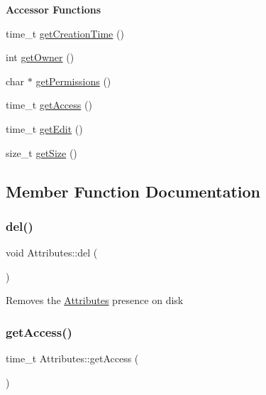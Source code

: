 \begin{Indent}\textbf{ Accessor Functions}\par
\begin{DoxyCompactItemize}
\item 
time\+\_\+t \mbox{\hyperlink{classAttributes_ac6436c08d31dfa33783feee3469a88e9}{get\+Creation\+Time}} ()
\item 
int \mbox{\hyperlink{classAttributes_a378205f2087ee66d95eb58aa5d7fb040}{get\+Owner}} ()
\item 
char $\ast$ \mbox{\hyperlink{classAttributes_af538b17bd7a459f4664446c574d83bd5}{get\+Permissions}} ()
\item 
time\+\_\+t \mbox{\hyperlink{classAttributes_a1b366a9e556ab09004064f23e84f6fcb}{get\+Access}} ()
\item 
time\+\_\+t \mbox{\hyperlink{classAttributes_a7b646531a3cb941912802eed0ef91f54}{get\+Edit}} ()
\item 
size\+\_\+t \mbox{\hyperlink{classAttributes_af9970a8e76e48221ec9d7832e1e558a3}{get\+Size}} ()
\end{DoxyCompactItemize}
\end{Indent}


\subsection{Member Function Documentation}
\mbox{\label{classAttributes_acf28e724c914f066ecdae788d95b3212}} 
\subsubsection{\texorpdfstring{del()}{del()}}
{\footnotesize\ttfamily void Attributes\+::del (\begin{DoxyParamCaption}{ }\end{DoxyParamCaption})}

Removes the \mbox{\hyperlink{classAttributes}{Attributes}} presence on disk \mbox{\label{classAttributes_a1b366a9e556ab09004064f23e84f6fcb}} 
\subsubsection{\texorpdfstring{get\+Access()}{getAccess()}}
{\footnotesize\ttfamily time\+\_\+t Attributes\+::get\+Access (\begin{DoxyParamCaption}{ }\end{DoxyParamCaption})}

